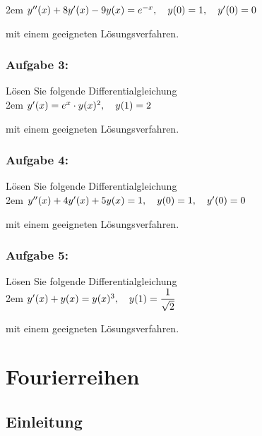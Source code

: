 \documentclass[11pt,final]{scrreprt}
\begin{document}
\begingroup
\leftskip2em 
$y''(x) + 8 y'(x) -9y(x)= e^{-x},\hspace*{1em} y(0) = 1, \hspace*{1em} y'(0) = 0$\\
\par	
\endgroup 
mit einem geeigneten Lösungsverfahren.

\subsection*{Aufgabe 3:}
Lösen Sie folgende Differentialgleichung \\

\begingroup
\leftskip2em 
$y'(x)  = e^x\cdot y(x)^2,\hspace*{1em} y(1) = 2$\\
\par	
\endgroup 
mit einem geeigneten Lösungsverfahren.

\subsection*{Aufgabe 4:}
Lösen Sie folgende Differentialgleichung \\

\begingroup
\leftskip2em 
$y''(x)+4y'(x)+5y(x)= 1,\hspace*{1em} y(0) = 1, \hspace*{1em} y'(0) = 0$\\
\par	
\endgroup 
mit einem geeigneten Lösungsverfahren.

\subsection*{Aufgabe 5:}
Lösen Sie folgende Differentialgleichung \\

\begingroup
\leftskip2em 
$y'(x) + y(x) = y(x)^3,\hspace*{1em} y(1) = \dfrac{1}{\sqrt{2}}$\\
\par	
\endgroup 
mit einem geeigneten Lösungsverfahren.

\chapter{Fourierreihen}		

\section{Einleitung}
\end{document}
